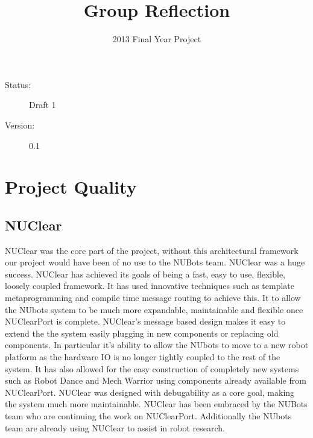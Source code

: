 \documentclass[english,12pt]{scrartcl}
\title{Group Reflection}
\author{2013 Final Year Project}
\begin{document}
	\maketitle
	\vfill
	{\large
		\begin{description}
			\item [Status:] Draft 1
			\item [Version:] 0.1
		\end{description}}

	\clearpage
	\tableofcontents
		
	\clearpage

\section{Project Quality}
	\subsection{NUClear}
		NUClear was the core part of the project, without this architectural framework our project would have been of no use to the NUBots team.
		NUClear was a huge success. NUClear has achieved its goals of being a fast, easy to use, flexible, loosely coupled framework.
		It has used innovative techniques such as template metaprogramming and compile time message routing to achieve this.
		It to allow the NUbots system to be much more expandable, maintainable and flexible once NUClearPort is complete.
		NUClear's message based design makes it easy to extend the the system easily plugging in new components or replacing old components.		
		In particular it's ability to allow the NUbots to move to a new robot platform as the hardware IO is no longer tightly coupled to the rest of the system.
		It has also allowed for the easy construction of completely new systems such as Robot Dance and Mech Warrior using components already available from NUClearPort.
		NUClear was designed with debugability as a core goal, making the system much more maintainable.
		NUClear has been embraced by the NUBots team who are continuing the work on NUClearPort.
		Additionally the NUbots team are already using NUClear to assist in robot research.
	
\end{document}
